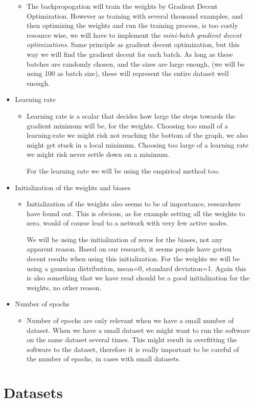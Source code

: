 \documentclass[Report.tex]{subfiles}
\begin{document}
\begin{flushleft}
\begin{itemize}
\begin{itemize}
    \item{The backpropogation will train the weights by Gradient Decent
    Optimization. However as training with several thousand examples, and then
    optimizing the weights and run the training process, is too costly resource
    wise, we will have to implement the \textit{mini-batch gradient decent
    optimizations}. Same principle as gradient decent optimization, but this way
    we will find the gradient decent for each batch. As long as these batches are
    randomly chosen, and the sizes are large enough, (we will be using 100 as
    batch size), these will represent the entire dataset well enough.}
   \end{itemize}
   \item{Learning rate}
   \begin{itemize}
    \item{Learning rate is a scalar that decides how large the steps towards
    the gradient minimum will be, for the weights. Choosing too small of a
    learning-rate we might risk not reaching the bottom of the graph, we also
    might get stuck in a local minimum. Choosing too large of a learning rate
    we might risk never settle down on a minimum. \par
    For the learning rate we will be using the empirical method too.}
   \end{itemize}
   \item{Initialization of the weights and biases}
   \begin{itemize}
    \item{Initialization of the weights also seems to be of importance,
    researchers have found out. This is obvious, as for example setting all the
    weights to zero, would of course lead to a network with very few active
    nodes. \par
    We will be using the initialization of zeros for the biases, not any
    apparent reason. Based on our research, it seems people have gotten decent
    results when using this initialization. For the weights we will be using a
    gaussian distribution, mean=0, standard deviation=1. Again this is also
    something that we have read should be a good initialization for the weights,
    no other reason.}
   \end{itemize}
   \item{Number of epochs}
   \begin{itemize}
    \item{Number of epochs are only relevant when we have a small number of
    dataset. When we have a small dataset we might want to run the software on
    the same dataset several times. This might result in overfitting the software
    to the dataset, therefore it is really important to be careful of the number of
    epochs, in cases with small datasets.}
   \end{itemize}
  \end{itemize}
\end{flushleft}


\section{Datasets}
\end{document}
